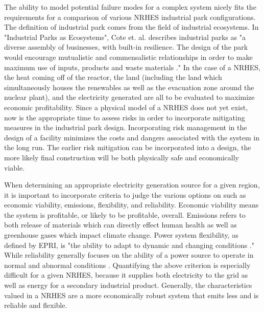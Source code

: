 \documentclass[12pt]{UIdahoMastersThesis}
\begin{document}
The ability to model potential failure modes for a complex system nicely fits the requirements for a comparison of various NRHES industrial park configurations. The definition of industrial park comes from the field of industrial ecosystems. In "Industrial Parks as Ecosystems", Cote et. al. describes industrial parks as "a diverse assembly of businesses, with built-in resilience. The design of the park would encourage mutualistic and commensalistic relationships in order to make maximum use of inputs, products and waste materials \cite{Cote1995}." In the case of a NRHES, the heat coming off of the reactor, the land (including the land which simultaneously houses the renewables as well as the evacuation zone around the nuclear plant), and the electricity generated are all to be evaluated to maximize economic profitability. Since a physical model of a NRHES does not yet exist, now is the appropriate time to assess risks in order to incorporate mitigating measures in the industrial park design. Incorporating risk management in the design of a facility minimizes the costs and dangers associated with the system in the long run. The earlier risk mitigation can be incorporated into a design, the more likely final construction will be both physically safe and economically viable.

When determining an appropriate electricity generation source for a given region, it is important to incorporate criteria to judge the various options on such as economic viability, emissions, flexibility, and reliability. Economic viability means the system is profitable, or likely to be profitable, overall.  Emissions refers to both release of materials which can directly effect human health as well as greenhouse gases which impact climate change. Power system flexibility, as defined by EPRI, is "the ability to adapt to dynamic and changing conditions \cite{EPRI2016}." While reliability generally focuses on the ability of a power source to operate in normal and abnormal conditions \cite{NERC2018}.   Quantifying the above criterion is especially difficult for a given NRHES, because it supplies both electricity to the grid as well as energy for a secondary industrial product. Generally, the characteristics valued in a NRHES are a more economically robust system that emits less and is reliable and flexible.
\end{document}
